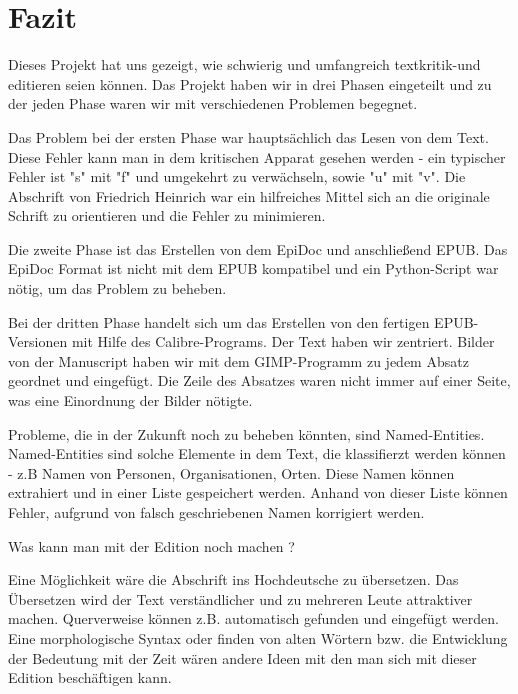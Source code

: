 \documentclass[a4paper, 12pt, oneside]{scrbook}
\begin{document}
\chapter{Fazit}

Dieses Projekt hat uns gezeigt, wie schwierig und umfangreich textkritik-und editieren seien können. Das Projekt haben wir in drei Phasen eingeteilt und zu der jeden Phase waren wir mit verschiedenen Problemen begegnet. 

Das Problem bei der ersten Phase war hauptsächlich das Lesen von dem Text. Diese Fehler kann man in dem kritischen Apparat gesehen werden - ein typischer Fehler ist "s" mit "f" und umgekehrt zu verwächseln, sowie "u" mit "v". Die Abschrift von Friedrich Heinrich war ein hilfreiches Mittel sich an die originale Schrift zu orientieren und die Fehler zu minimieren.

Die zweite Phase ist das Erstellen von dem EpiDoc und anschließend EPUB. Das EpiDoc Format ist nicht mit dem EPUB kompatibel und ein Python-Script war nötig, um das Problem zu beheben. 

Bei der dritten Phase handelt sich um das Erstellen von den fertigen EPUB-Versionen mit Hilfe des Calibre-Programs. Der Text haben wir zentriert. Bilder von der Manuscript haben wir mit dem GIMP-Programm zu jedem Absatz geordnet und eingefügt. Die Zeile des Absatzes waren nicht immer auf einer Seite, was eine Einordnung der Bilder nötigte. 

Probleme, die in der Zukunft noch zu beheben könnten, sind Named-Entities. Named-Entities sind solche Elemente in dem Text, die klassifierzt werden können - z.B Namen von Personen, Organisationen, Orten. Diese Namen können extrahiert und in einer Liste gespeichert werden. Anhand von dieser Liste können Fehler, aufgrund von falsch geschriebenen Namen korrigiert werden. 


Was kann man mit der Edition noch machen ? 

Eine Möglichkeit wäre die Abschrift ins Hochdeutsche zu übersetzen. Das Übersetzen wird der Text verständlicher und zu mehreren Leute attraktiver machen. 
Querverweise können z.B. automatisch gefunden und eingefügt werden. Eine morphologische Syntax oder finden von alten Wörtern bzw. die Entwicklung der Bedeutung mit der Zeit wären andere Ideen mit den man sich mit dieser Edition beschäftigen kann. 
 

\printbibliography
\end{document}
